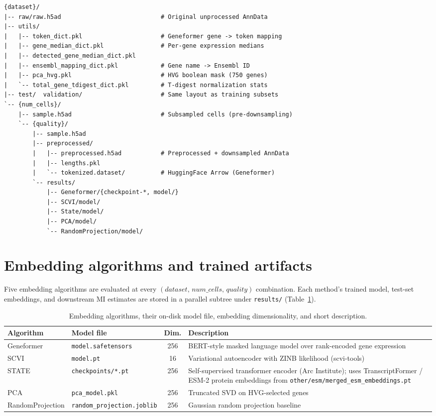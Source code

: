 \documentclass{article}
\begin{document}
\begin{lstlisting}
{dataset}/
|-- raw/raw.h5ad                            # Original unprocessed AnnData
|-- utils/
|   |-- token_dict.pkl                      # Geneformer gene -> token mapping
|   |-- gene_median_dict.pkl                # Per-gene expression medians
|   |-- detected_gene_median_dict.pkl
|   |-- ensembl_mapping_dict.pkl            # Gene name -> Ensembl ID
|   |-- pca_hvg.pkl                         # HVG boolean mask (750 genes)
|   `-- total_gene_tdigest_dict.pkl         # T-digest normalization stats
|-- test/  validation/                      # Same layout as training subsets
`-- {num_cells}/
    |-- sample.h5ad                         # Subsampled cells (pre-downsampling)
    `-- {quality}/
        |-- sample.h5ad
        |-- preprocessed/
        |   |-- preprocessed.h5ad           # Preprocessed + downsampled AnnData
        |   |-- lengths.pkl
        |   `-- tokenized.dataset/          # HuggingFace Arrow (Geneformer)
        `-- results/
            |-- Geneformer/{checkpoint-*, model/}
            |-- SCVI/model/
            |-- State/model/
            |-- PCA/model/
            `-- RandomProjection/model/
\end{lstlisting}

\section{Embedding algorithms and trained artifacts}

Five embedding algorithms are evaluated at every $(\textit{dataset},\, \textit{num\_cells},\, \textit{quality})$ combination. Each method's trained model, test-set embeddings, and downstream MI estimates are stored in a parallel subtree under \texttt{results/} (Table~\ref{tab:algorithms}).

\begin{table}[!htbp]
\centering
\caption{Embedding algorithms, their on-disk model file, embedding dimensionality, and short description.}
\label{tab:algorithms}
\small
\begin{tabular}{llcp{6.5cm}}
\toprule
\textbf{Algorithm} & \textbf{Model file} & \textbf{Dim.} & \textbf{Description} \\
\midrule
Geneformer        & \texttt{model.safetensors}      & 256 & BERT-style masked language model over rank-encoded gene expression \\
SCVI              & \texttt{model.pt}               & 16  & Variational autoencoder with ZINB likelihood (scvi-tools) \\
STATE             & \texttt{checkpoints/*.pt}       & 256 & Self-supervised transformer encoder (Arc Institute); uses TranscriptFormer / ESM-2 protein embeddings from \texttt{other/esm/merged\_esm\_embeddings.pt} \\
PCA               & \texttt{pca\_model.pkl}         & 256 & Truncated SVD on HVG-selected genes \\
RandomProjection  & \texttt{random\_projection.joblib} & 256 & Gaussian random projection baseline \\
\bottomrule
\end{tabular}
\end{table}
\end{document}
